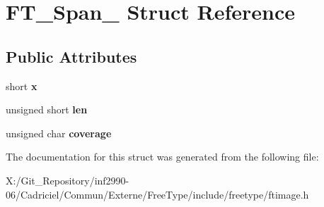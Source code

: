 \hypertarget{struct_f_t___span__}{\section{F\-T\-\_\-\-Span\-\_\- Struct Reference}
\label{struct_f_t___span__}
}
\subsection*{Public Attributes}
\begin{DoxyCompactItemize}
\item 
\hypertarget{struct_f_t___span___a7f7235a404c66398b49c50fa09691ba5}{short {\bfseries x}}\label{struct_f_t___span___a7f7235a404c66398b49c50fa09691ba5}

\item 
\hypertarget{struct_f_t___span___a939c84317f25a97d0ba01704591a4d38}{unsigned short {\bfseries len}}\label{struct_f_t___span___a939c84317f25a97d0ba01704591a4d38}

\item 
\hypertarget{struct_f_t___span___a70f9c9e0e8d3f0b38adee03a508ae214}{unsigned char {\bfseries coverage}}\label{struct_f_t___span___a70f9c9e0e8d3f0b38adee03a508ae214}

\end{DoxyCompactItemize}


The documentation for this struct was generated from the following file\-:\begin{DoxyCompactItemize}
\item 
X\-:/\-Git\-\_\-\-Repository/inf2990-\/06/\-Cadriciel/\-Commun/\-Externe/\-Free\-Type/include/freetype/ftimage.\-h\end{DoxyCompactItemize}
